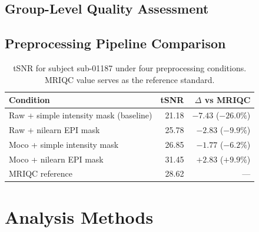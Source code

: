 \documentclass[11pt, a4paper]{article}
\begin{document}
\subsection{Group-Level Quality Assessment}


\subsection{Preprocessing Pipeline Comparison}

\begin{table}[H]
    \centering
    \caption{tSNR for subject sub-01187 under four preprocessing conditions.
             MRIQC value serves as the reference standard.}
    \label{tab:preprocessing_comparison}
    \begin{tabular}{lrr}
        \toprule
        \textbf{Condition} & \textbf{tSNR} & \textbf{$\Delta$ vs MRIQC} \\
        \midrule
        Raw + simple intensity mask (baseline) & 21.18 & $-7.43$ ($-26.0\%$) \\
        Raw + nilearn EPI mask                 & 25.78 & $-2.83$ ($-9.9\%$)  \\
        Moco + simple intensity mask           & 26.85 & $-1.77$ ($-6.2\%$)  \\
        Moco + nilearn EPI mask                & 31.45 & $+2.83$ ($+9.9\%$)  \\
        \midrule
        MRIQC reference                        & 28.62 & ---                  \\
        \bottomrule
    \end{tabular}
\end{table}

\section{Analysis Methods}
\label{sec:methods}
\end{document}
